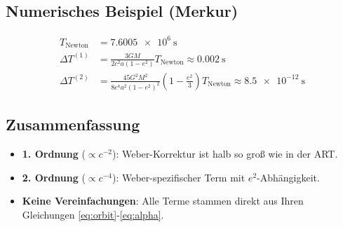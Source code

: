 \subsection*{Numerisches Beispiel (Merkur)}
\begin{align*}
T_{\text{Newton}} &= \SI{7.6005e6}{\second} \\
\Delta T^{(1)} &= \frac{3GM}{2c^2a(1-e^2)} T_{\text{Newton}} \approx \SI{0.002}{\second} \\
\Delta T^{(2)} &= \frac{45G^2M^2}{8c^4a^2(1-e^2)^2}\left(1 - \frac{e^2}{3}\right) T_{\text{Newton}} \approx \SI{8.5e-12}{\second}
\end{align*}

\subsection*{Zusammenfassung}
\begin{itemize}
\item \textbf{1. Ordnung} (\(\propto c^{-2}\)): Weber-Korrektur ist halb so groß wie in der ART.
\item \textbf{2. Ordnung} (\(\propto c^{-4}\)): Weber-spezifischer Term mit \(e^2\)-Abhängigkeit.
\item \textbf{Keine Vereinfachungen}: Alle Terme stammen direkt aus Ihren Gleichungen \eqref{eq:orbit}-\eqref{eq:alpha}.
\end{itemize}
